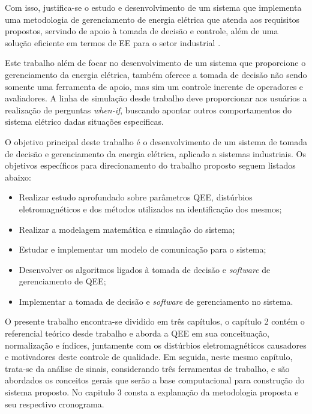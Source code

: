 \par
Com isso, justifica-se o estudo e desenvolvimento de um sistema que implementa uma metodologia de gerenciamento de energia elétrica que atenda aos requisitos propostos, servindo de apoio à tomada de decisão e controle, além de uma solução eficiente em termos de \ac{EE} para o setor industrial \cite{GAR09}.
\par
Este trabalho além de focar no desenvolvimento de um sistema que proporcione o gerenciamento da energia elétrica, também oferece a tomada de decisão não sendo somente uma ferramenta de apoio, mas sim um controle inerente de operadores e avaliadores. A linha de simulação desde trabalho deve proporcionar aos usuários a realização de perguntas \emph{when-if}, buscando apontar outros comportamentos do sistema elétrico dadas situações especificas.
\par
O objetivo principal deste trabalho é o desenvolvimento de um sistema de tomada de decisão e gerenciamento da energia elétrica, aplicado a sistemas industriais. Os objetivos específicos para direcionamento do trabalho proposto seguem listados abaixo:
\begin{itemize}
	\item Realizar estudo aprofundado sobre parâmetros QEE, distúrbios eletromagnéticos e dos métodos utilizados na identificação dos mesmos;
	\item Realizar a modelagem matemática e simulação do sistema;
	\item Estudar e implementar  um modelo de comunicação para o sistema;
	\item Desenvolver os algoritmos ligados à tomada de decisão e \textit{software} de gerenciamento de \ac{QEE};
	\item Implementar a tomada de decisão e \textit{software} de gerenciamento no sistema.
\end{itemize}
\par
{}%
O presente trabalho encontra-se dividido em três capítulos, o capítulo 2 contém o referencial teórico desde trabalho e aborda a \acl{QEE} em sua conceituação, normalização e índices, juntamente com os distúrbios eletromagnéticos causadores e motivadores deste controle de qualidade. 
Em seguida, neste mesmo capítulo, trata-se da análise de sinais, considerando três ferramentas de trabalho, e são abordados os conceitos gerais que serão a base computacional para construção do sistema proposto. No capitulo 3 consta a explanação da metodologia proposta e seu respectivo cronograma.